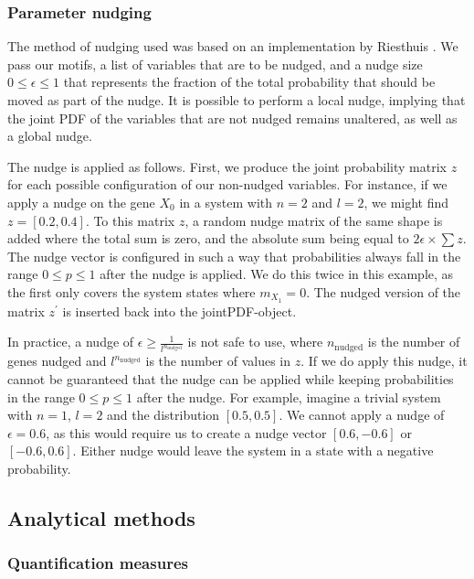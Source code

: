 \documentclass[../main.tex]{subfiles}
\begin{document}
\subsubsection{Parameter nudging}

The method of nudging used was based on an implementation by Riesthuis \cite{DJ_repository}.
We pass our motifs, a list of variables that are to be nudged, and a nudge size $0 \le \epsilon \le 1$ that represents the fraction of the total probability that should be moved as part of the nudge.
It is possible to perform a local nudge, implying that the joint PDF of the variables that are not nudged remains unaltered, as well as a global nudge.

The nudge is applied as follows.
First, we produce the joint probability matrix $z$ for each possible configuration of our non-nudged variables.
For instance, if we apply a nudge on the gene $X_0$ in a system with $n=2$ and $l=2$, we might find $z = [0.2, 0.4]$.
To this matrix $z$, a random nudge matrix of the same shape is added where the total sum is zero, and the absolute sum being equal to $2 \epsilon \times \sum z$.
The nudge vector is configured in such a way that probabilities always fall in the range $0 \le p \le 1$ after the nudge is applied.
We do this twice in this example, as the first only covers the system states where $m_{X_1} = 0$.
The nudged version of the matrix $z^\prime$ is inserted back into the jointPDF-object.

In practice, a nudge of $\epsilon \ge \frac{1}{l^{n_\mathrm{nudged}}}$ is not safe to use, where $n_\mathrm{nudged}$ is the number of genes nudged and $l^{n_\mathrm{nudged}}$ is the number of values in $z$.
If we do apply this nudge, it cannot be guaranteed that the nudge can be applied while keeping probabilities in the range $0 \le p \le 1$ after the nudge.
For example, imagine a trivial system with $n = 1$, $l = 2$ and the distribution $[0.5, 0.5]$.
We cannot apply a nudge of $\epsilon = 0.6$, as this would require us to create a nudge vector $[0.6, -0.6]$ or $[-0.6, 0.6]$.
Either nudge would leave the system in a state with a negative probability.

\subsection{Analytical methods}

\subsubsection{Quantification measures}
\end{document}
